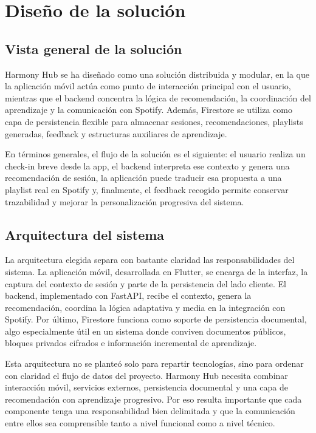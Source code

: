 \chapter{Diseño de la solución}
\label{ch:diseno_solucion}


\section{Vista general de la solución}
\label{sec:vista_general_solucion}

Harmony Hub se ha diseñado como una solución distribuida y modular, en la que
la aplicación móvil actúa como punto de interacción principal con el usuario,
mientras que el backend concentra la lógica de recomendación, la coordinación
del aprendizaje y la comunicación con Spotify. Además, Firestore se utiliza
como capa de persistencia flexible para almacenar sesiones, recomendaciones,
playlists generadas, feedback y estructuras auxiliares de aprendizaje.

En términos generales, el flujo de la solución es el siguiente: el usuario
realiza un check-in breve desde la app, el backend interpreta ese contexto y
genera una recomendación de sesión, la aplicación puede traducir esa propuesta
a una playlist real en Spotify y, finalmente, el feedback recogido permite
conservar trazabilidad y mejorar la personalización progresiva del sistema.

\section{Arquitectura del sistema}
\label{sec:arquitectura}

La arquitectura elegida separa con bastante claridad las responsabilidades del
sistema. La aplicación móvil, desarrollada en Flutter, se encarga de la
interfaz, la captura del contexto de sesión y parte de la persistencia del lado
cliente. El backend, implementado con FastAPI, recibe el contexto, genera la
recomendación, coordina la lógica adaptativa y media en la integración con
Spotify. Por último, Firestore funciona como soporte de persistencia documental,
algo especialmente útil en un sistema donde conviven documentos públicos,
bloques privados cifrados e información incremental de aprendizaje.

Esta arquitectura no se planteó solo para repartir tecnologías, sino para
ordenar con claridad el flujo de datos del proyecto. Harmony Hub necesita
combinar interacción móvil, servicios externos, persistencia documental y una
capa de recomendación con aprendizaje progresivo. Por eso resulta importante
que cada componente tenga una responsabilidad bien delimitada y que la
comunicación entre ellos sea comprensible tanto a nivel funcional como a nivel
técnico.


